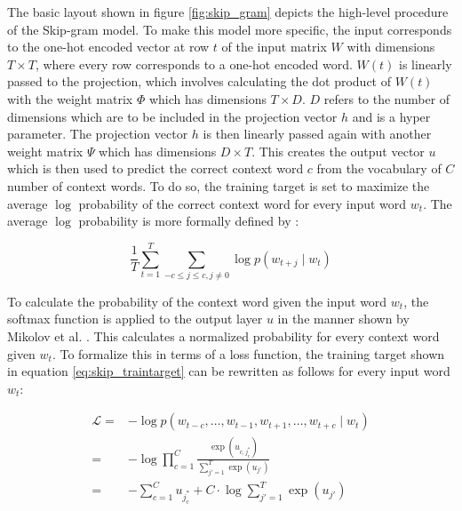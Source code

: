 	\noindent The basic layout shown in figure \ref{fig:skip_gram} depicts the
	high-level procedure of the Skip-gram model. To make this model more
	specific, the input corresponds to the one-hot encoded vector at row $t$ of
	the input matrix $W$ with dimensions $T \times T$, where every row 
	corresponds to a one-hot encoded word. $W(t)$ is linearly passed to the
	projection, which involves calculating the dot product of $W(t)$ with the 
	weight matrix $\Phi$ which has dimensions $T \times D$. $D$ refers to the
	number of dimensions which are to be included in the projection vector $h$ 
	and is a hyper parameter. The projection vector $h$ is then linearly passed
	again with another weight matrix $\Psi$ which has dimensions $D \times T$.
	This creates the output vector $u$ which is then used to predict the correct
	context word $c$ from the vocabulary of $C$ number of context words. To do 
	so, the training target is set to maximize the average $\log$ probability 
	of the correct context word for every input word $w_{t}$. 
	\newpage
	\noindent The average $\log$ probability is more formally defined by 
	\citep[p. 2]{mikolov2013distributed}:

	\begin{equation}
		\frac{1}{T}\sum_{t=1}^{T}\sum_{-c \leqslant j \leqslant c,j\neq0}\log
		p(w_{t+j}\mid w_{t})
		\label{eq:skip_traintarget}
	\end{equation}

	\noindent To calculate the probability of the context word given the input
	word $w_{t}$, the softmax function
	\citep{bridle1990probabilistic,bridle1990training} is applied to the output 
	layer $u$ in the manner shown by Mikolov et al. 
	\citeyearpar[p. 3]{mikolov2013distributed}. This calculates a normalized 
	probability for every context word given $w_{t}$. To formalize this in 
	terms of a loss function, the training target shown in equation 
	\ref{eq:skip_traintarget} can be rewritten as follows for every input word 
	$w_{t}$: 

	\begin{equation}
		\begin{split}
		\mathcal{L} =& - \log p(w_{t-c},\dots,w_{t-1},w_{t+1},\dots,w_{t+c}\mid w_{t})\\
			=& - \log \prod_{c=1}^{C}\frac{\exp(u_{c,j_{c}^{*}})}{\sum_{j'=1}^{T}
			\exp(u_{j'})}\\
			=&	- \sum_{c=1}^{C} u_{j_{c}^{*}} + C \cdot \log
								\sum_{j'=1}^{T} \exp(u_{j'})
		\label{eq:deepwalk_loss}
	\end{split}
	\end{equation}

